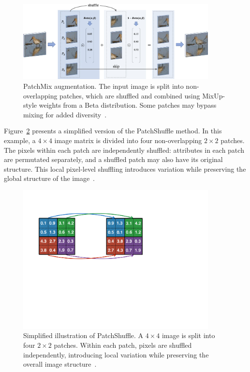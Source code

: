 \begin{figure}[h!]
    \centering
\includegraphics[page=1, width=0.9\textwidth]{./images/patchmix.png}
\caption{PatchMix augmentation. The input image is split into non-overlapping patches, which are shuffled and combined using MixUp-style weights from a Beta distribution. Some patches may bypass mixing for added diversity~\cite{hong2024patchmix}.}
    \label{fig:patchmix}
\end{figure}



Figure~\ref{fig:patchshuffle} presents a simplified version of the PatchShuffle method. In this example, a $4 \times 4$ image matrix is divided into four non-overlapping $2 \times 2$ patches. The pixels within each patch are independently shuffled: attributes in each patch are permutated separately, and a shuffled patch may also have its original structure. This local pixel-level shuffling introduces variation while preserving the global structure of the image~\cite{kang2017patchshuffleregularization}.



\begin{figure}[h!]
    \centering
\includegraphics[page=1, width=0.9\textwidth]{./images/PatchShuffle.pdf}
\caption{Simplified illustration of PatchShuffle. A $4 \times 4$ image is split into four $2 \times 2$ patches. Within each patch, pixels are shuffled independently, introducing local variation while preserving the overall image structure~\cite{kang2017patchshuffleregularization}.}
    \label{fig:patchshuffle}
\end{figure}

